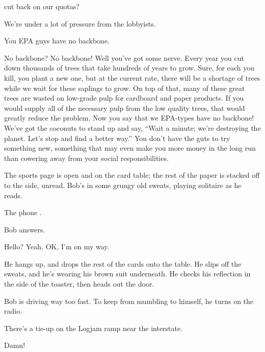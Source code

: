 
 

 \pickup cut back on our quotas?

 We're under a lot of pressure from the lobbyists.

 You EPA guys have no backbone.


 No backbone?  No backbone!  Well you've got some
nerve.  Every year you cut down thousands of trees that take hundreds of years
to grow.  Sure, for each you kill, you plant a new one, but at the current
rate, there will be a shortage of trees while we wait for these saplings to
grow.  On top of that, many of these great trees are wasted on low-grade pulp
for cardboard and paper products.  If you would supply all of the necessary
pulp from the low quality trees, that would greatly reduce the problem.  Now
you say that we EPA-types have no backbone!  We've got the coconuts to stand up
and say, ``Wait a minute; we're destroying the planet.  Let's stop and find a
better way.''  You don't have the guts to try something new, something that may
even make you more money in the long run than cowering away from your social
responsibilities.



\act %

\fadein


The sports page is open and on the card table; the rest of the paper is
stacked off to the side, unread.  Bob's in some grungy old sweats, playing
solitaire as he reads.

The phone .

Bob answers.

\def\Bob{}

\Bob Hello? \beat Yeah.  OK, I'm on my way.

He hangs up, and drops the rest of the cards onto the table.  He slips off the
sweats, and he's wearing his brown suit underneath.  He checks his reflection
in the side of the toaster, then heads out the door.

\dissolve


Bob is driving way too fast.  To keep from mumbling to himself, he
turns on the radio.

 \vo There's a tie-up on the Logjam ramp near the interstate.

\Bob Damn!

\fadeout
\theend

\bye %

